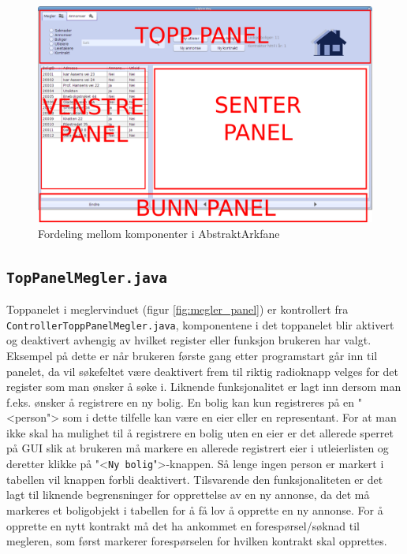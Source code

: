 \begin{figure}[ht]
 \includegraphics[width=\textwidth,height=\textheight,keepaspectratio]{./img/produktdokumentasjon/swing_componenter/AbstraktArkfane.png}
 \caption[Komponenter i AbstraktArkafane]{Fordeling mellom komponenter i AbstraktArkfane}
 \label{fig:asbtarkfane}
\end{figure}



\subsection{\texttt{TopPanelMegler.java}} \label{subsec:meglerpanel}
Toppanelet i meglervinduet (figur \ref{fig:megler_panel}) er kontrollert fra \texttt{ControllerToppPanelMegler.java}, komponentene i det toppanelet blir aktivert og deaktivert avhengig av hvilket register eller funksjon brukeren har valgt. Eksempel på dette er når brukeren første gang etter programstart går inn til panelet, da vil søkefeltet være deaktivert frem til riktig radioknapp velges for det register som man ønsker å søke i. Liknende funksjonalitet er lagt inn dersom man f.eks. ønsker å registrere en ny bolig. En bolig kan kun registreres på en "<person"> som i dette tilfelle kan være en eier eller en representant. For at man ikke skal ha mulighet til å registrere en bolig uten en eier er det allerede sperret på GUI slik at brukeren må markere en allerede registrert eier i utleierlisten og deretter klikke på "<\texttt{Ny bolig}">-knappen. Så lenge ingen person er markert i tabellen vil knappen forbli deaktivert. Tilsvarende den funksjonaliteten er det lagt til liknende begrensninger for opprettelse av en ny annonse, da det må markeres et boligobjekt i tabellen for å få lov å opprette en ny annonse. For å opprette en nytt kontrakt må det ha ankommet en forespørsel/søknad til megleren, som først markerer forespørselen for hvilken kontrakt skal opprettes. 

